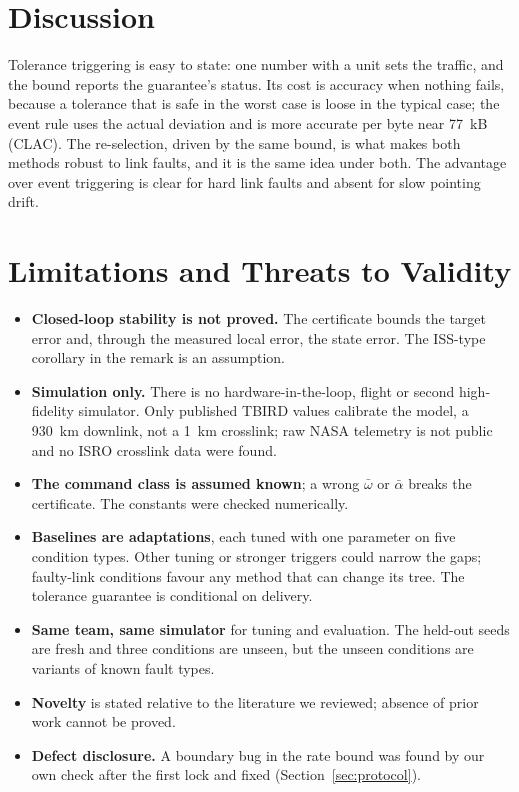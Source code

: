 \documentclass[journal]{IEEEtran}
\begin{document}
\section{Discussion}
Tolerance triggering is easy to state: one number with a unit sets the traffic, and the bound reports the guarantee's status. Its cost is accuracy when nothing fails, because a tolerance that is safe in the worst case is loose in the typical case; the event rule uses the actual deviation and is more accurate per byte near 77~kB (CLAC). The re-selection, driven by the same bound, is what makes both methods robust to link faults, and it is the same idea under both. The advantage over event triggering is clear for hard link faults and absent for slow pointing drift.

\section{Limitations and Threats to Validity}\label{sec:limits}
\begin{itemize}
\item \textbf{Closed-loop stability is not proved.} The certificate bounds the target error and, through the measured local error, the state error. The ISS-type corollary in the remark is an assumption.
\item \textbf{Simulation only.} There is no hardware-in-the-loop, flight or second high-fidelity simulator. Only published TBIRD values calibrate the model, a 930~km downlink, not a 1~km crosslink; raw NASA telemetry is not public and no ISRO crosslink data were found.
\item \textbf{The command class is assumed known}; a wrong $\bar\omega$ or $\bar\alpha$ breaks the certificate. The constants were checked numerically.
\item \textbf{Baselines are adaptations}, each tuned with one parameter on five condition types. Other tuning or stronger triggers could narrow the gaps; faulty-link conditions favour any method that can change its tree. The tolerance guarantee is conditional on delivery.
\item \textbf{Same team, same simulator} for tuning and evaluation. The held-out seeds are fresh and three conditions are unseen, but the unseen conditions are variants of known fault types.
\item \textbf{Novelty} is stated relative to the literature we reviewed; absence of prior work cannot be proved.
\item \textbf{Defect disclosure.} A boundary bug in the rate bound was found by our own check after the first lock and fixed (Section~\ref{sec:protocol}).
\end{itemize}
\end{document}
